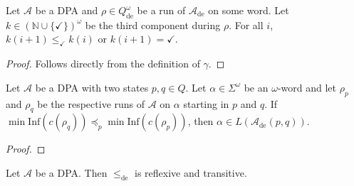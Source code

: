 \begin{lem}
\label{lem:fritzwilke:k_shrink}
	Let $\mathcal{A}$ be a DPA and $\rho \in Q_\text{de}^\omega$ be a run of $\mathcal{A}_\text{de}$ on some word. Let $k \in (\mathbb{N} \cup \{\checkmark\})^\omega$ be the third component during $\rho$. For all $i$, $k(i+1) \leq_\checkmark k(i)$ or $k(i+1) = \checkmark$.
\end{lem}

\begin{proof}
	Follows directly from the definition of $\gamma$.
\end{proof}

\begin{lem}
\label{lem:fritzwilke:run_goodness_implies_de}
	Let $\mathcal{A}$ be a DPA with two states $p, q \in Q$. Let $\alpha \in \Sigma^\omega$ be an $\omega$-word and let $\rho_p$ and $\rho_q$ be the respective runs of $\mathcal{A}$ on $\alpha$ starting in $p$ and $q$. If $\min \text{Inf}(c(\rho_q)) \preceq_p \min \text{Inf}(c(\rho_p))$, then $\alpha \in L(\mathcal{A}_\text{de}(p, q))$.
\end{lem}

\begin{proof}
\end{proof}

\begin{lem}
\label{lem:fritzwilke:de_order_reftran}
	Let $\mathcal{A}$ be a DPA. Then $\leq_\text{de}$ is reflexive and transitive.
\end{lem}

